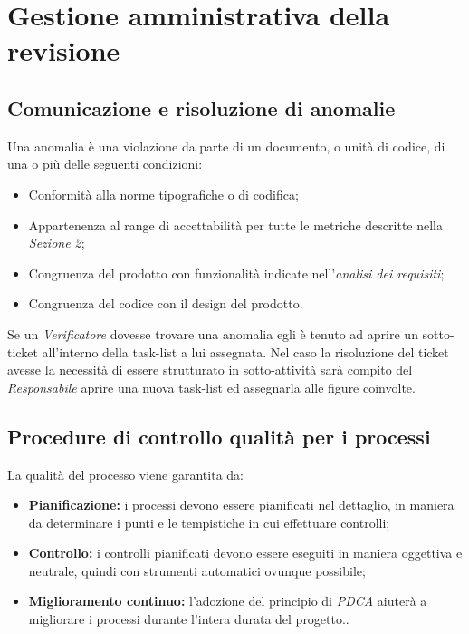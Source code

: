 \documentclass[a4paper]{article}
\begin{document}
	\section{Gestione amministrativa della revisione}
		\subsection{Comunicazione e risoluzione di anomalie}
			Una anomalia è una violazione da parte di un documento, o unità di codice, di una o più delle seguenti condizioni:
			\begin{itemize}
				\item Conformità alla norme tipografiche o di codifica;
				\item Appartenenza al range di accettabilità per tutte le metriche descritte nella \emph{Sezione 2};
				\item Congruenza del prodotto con funzionalità indicate nell'\emph{analisi dei requisiti};
				\item Congruenza del codice con il design del prodotto.
			\end{itemize}
			Se un \emph{Verificatore} dovesse trovare una anomalia egli è tenuto ad aprire un sotto-ticket all'interno 
			della task-list a lui assegnata. Nel caso la risoluzione del ticket avesse la necessità di essere strutturato 
			in sotto-attività sarà compito del \emph{Responsabile} aprire una nuova task-list ed assegnarla alle figure coinvolte.

		\subsection{Procedure di controllo qualità per i processi}
			La qualità del processo viene garantita da:
			\begin{itemize}
				\item \textbf{Pianificazione:} i processi devono essere pianificati nel dettaglio, in maniera da determinare 
				i punti e le tempistiche in cui effettuare controlli;
				\item \textbf{Controllo:} i controlli pianificati devono essere eseguiti in maniera oggettiva e neutrale, 
				quindi con strumenti automatici ovunque possibile;
				\item \textbf{Miglioramento continuo:} l'adozione del principio di \emph{PDCA} aiuterà a migliorare i processi durante l'intera durata del progetto..
			\end{itemize}
\end{document}
